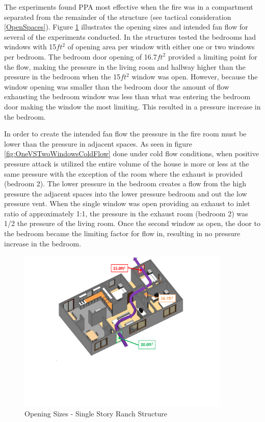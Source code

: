 \documentclass{article}
\begin{document}
The experiments found PPA most effective when the fire was in a compartment separated from the remainder of the structure (see tactical consideration \ref{OpenSpaces}). Figure \ref{fig:RanchStructureOpenings} illustrates the opening sizes and intended fan flow for several of the experiments conducted. In the structures tested the bedrooms had windows with 15$ft^2$ of opening area per window with either one or two windows per bedroom. The bedroom door opening of 16.7$ft^2$ provided a limiting point for the flow, making the pressure in the living room and hallway higher than the pressure in the bedroom when the 15$ft^2$ window was open. However, because the window opening was smaller than the bedroom door the amount of flow exhausting the bedroom window was less than what was entering the bedroom door making the window the most limiting. This resulted in a pressure increase in the bedroom. 

In order to create the intended fan flow the pressure in the fire room must be lower than the pressure in adjacent spaces. As seen in figure \ref{fig:OneVSTwoWindowsColdFlow} done under cold flow conditions, when positive pressure attack is utilized the entire volume of the house is more or less at the same pressure with the exception of the room where the exhaust is provided (bedroom 2). The lower pressure in the bedroom creates a flow from the high pressure the adjacent spaces into the lower pressure bedroom and out the low pressure vent. When the single window was open providing an exhaust to inlet ratio of approximately 1:1, the pressure in the exhaust room (bedroom 2) was 1/2 the pressure of the living room. Once the second window as open, the door to the bedroom became the limiting factor for flow in, resulting in no pressure increase in the bedroom.

\begin{figure}[H]
	\centering
	\includegraphics[width = 4in]{0_Images/Tactical_Considerations/PPA_Exhaust_Dependant/Opening_Sizes.pdf}
	\caption{Opening Sizes - Single Story Ranch Structure}
	\label{fig:RanchStructureOpenings}
\end{figure}
\end{document}
